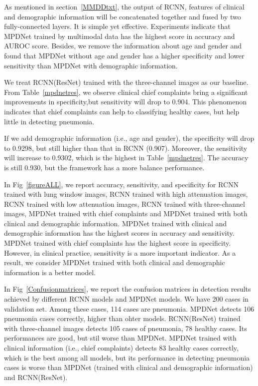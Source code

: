 \documentclass[journal]{IEEEtran}
\begin{document}
As mentioned in section~\ref{MMDDtxt}, the output of RCNN, features of clinical and demographic information will be concatenated together and fused by two fully-connected layers. It is simple yet effective. Experiments indicate that MPDNet trained by multimodal data has the highest score in accuracy and AUROC score. 
Besides, we remove the information about age and gender and found that MPDNet without age and gender has a higher specificity and lower sensitivity than MPDNet with demographic information. 


We treat RCNN(ResNet) trained with the three-channel images as our baseline. From Table~\ref{mpdnetres}, we observe clinical chief complaints bring a significant improvements in specificity,but sensitivity will drop to 0.904. This phenomenon indicates that chief complaints can help to classifying healthy cases, but help little in detecting pneumonia.

If we add demographic information (i.e., age and gender), the specificity will drop to 0.9298, but still higher than that in RCNN (0.907). Moreover, the sensitivity will increase to 0.9302, which is the highest in Table~\ref{mpdnetres}. The accuracy is still 0.930, but the framework has a more balance performance.



In Fig~\ref{figureALL}, we report accuracy, sensitivity, and specificity for RCNN trained with lung window images, RCNN trained with high attenuation images, RCNN trained with low attenuation images, RCNN trained with three-channel images, MPDNet trained with chief complaints and MPDNet trained with both clinical and demographic information. MPDNet trained with clinical and demographic information has the highest scores in accuracy and sensitivity. MPDNet trained with chief complaints has the highest score in specificity. However, in clinical practice, sensitivity is a more important indicator. As a result, we consider MPDNet trained with both clinical and demographic information is a better model. 

In Fig~\ref{Confusionmatrices}, we report the confusion matrices in detection results achieved by different RCNN models and MPDNet models. We have 200 cases in validation set. Among these cases, 114 cases are pneumonia. MPDNet detects 106 pneumonia cases correctly, higher than ohter models. RCNN(ResNet) trained with three-channel images detects 105 cases of pneumonia, 78 healthy cases. Its performances are good, but stil worse than MPDNet. MPDNet trained with clinical information (i.e., chief complaints) detects 83 healthy cases correctly, which is the best among all models, but its performance in detecting pneumonia cases is worse than MPDNet (trained with clinical and demographic information) and RCNN(ResNet).
\end{document}
